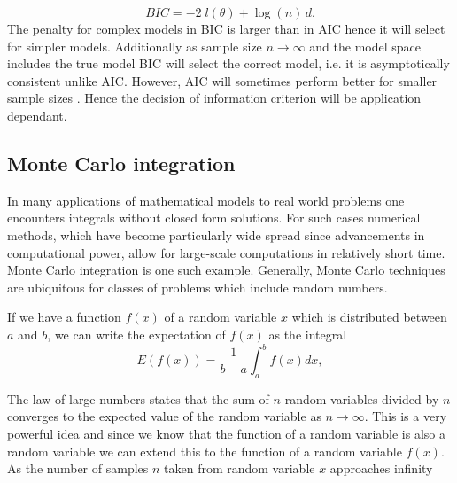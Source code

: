 \begin{equation}
  \label{eq:bic-def}
  BIC = -2 \; l(\theta) + \log(n) \,d.
\end{equation}
The penalty for complex models in BIC is larger than in AIC hence it will select for simpler models. Additionally as sample size $n\rightarrow \infty$ and the model space includes the true model BIC will select the correct model, i.e. it is asymptotically consistent unlike AIC. However, AIC will sometimes perform better for smaller sample sizes \citep{hastie2001elements}. Hence the decision of information criterion will be application dependant.

\subsection{Monte Carlo integration}
\label{sec:monte-carlo-integr}

In many applications of mathematical models to real world problems one encounters integrals without closed form solutions. For such cases numerical methods, which have become particularly wide spread since advancements in computational power, allow for large-scale computations in relatively short time. Monte Carlo integration is one such example. Generally, Monte Carlo techniques are ubiquitous for classes of problems which include random numbers.

If we have a function $f(x)$ of a random variable $x$  which is distributed between $a$ and $b$, we can write the expectation of $f(x)$ as the integral
\begin{equation}
  \label{eq:mc-integ-def}
  E(f(x)) = \frac{1}{b-a} \int_a^b f(x) dx,
\end{equation}

The law of large numbers states that the sum of $n$ random variables divided by $n$ converges to the expected value of the random variable as $n \rightarrow \infty$. This is a very powerful idea and since we know that the function of a random variable is also a random variable we can extend this to the function of a random variable $f(x)$.  As the number of samples $n$ taken from random variable $x$ approaches infinity

